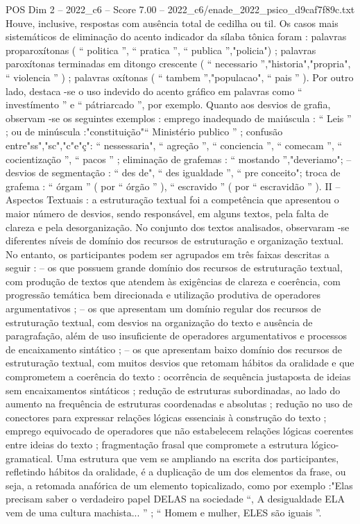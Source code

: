 \begin{textsample}{POS Dim 2 – 2022\_c6 – Score 7.00 – 2022\_c6/enade\_2022\_psico\_d9caf7f89c.txt}
Houve, inclusive, respostas com ausência total de cedilha ou til.
Os casos mais sistemáticos de eliminação do acento indicador da sílaba tônica foram : palavras proparoxítonas ( “ politica ”, “ pratica ”, “ publica ”,"policia") ; palavras paroxítonas terminadas em ditongo crescente ( “ necessario ”,"historia","propria", “ violencia ” ) ; palavras oxítonas ( “ tambem ”,"populacao", “ pais ” ).
Por outro lado, destaca -se o uso indevido do acento gráfico em palavras como “ investímento ” e “ pátriarcado ”, por exemplo.
Quanto aos desvios de grafia, observam -se os seguintes exemplos : emprego inadequado de maiúscula : “ Leis ” ; ou de minúscula :"constituição"“ Ministério publico ” ; confusão entre"ss","sc","c"e"ç": “ nessessaria", “ agreção ”, “ conciencia ”, “ comecam ”, “ cocientização ”, “ pacos ” ; eliminação de grafemas : “ mostando ”,"deveriamo"; – desvios de segmentação : “ des de", “ des igualdade ”, “ pre conceito"; troca de grafema : “ órgam ” ( por “ órgão ” ), “ escravido ” ( por “ escravidão ” ).
II – Aspectos Textuais : a estruturação textual foi a competência que apresentou o maior número de desvios, sendo responsável, em alguns textos, pela falta de clareza e pela desorganização.
No conjunto dos textos analisados, observaram -se diferentes níveis de domínio dos recursos de estruturação e organização textual.
No entanto, os participantes podem ser agrupados em três faixas descritas a seguir : – os que possuem grande domínio dos recursos de estruturação textual, com produção de textos que atendem às exigências de clareza e coerência, com progressão temática bem direcionada e utilização produtiva de operadores argumentativos ; – os que apresentam um domínio regular dos recursos de estruturação textual, com desvios na organização do texto e ausência de paragrafação, além de uso insuficiente de operadores argumentativos e processos de encaixamento sintático ; – os que apresentam baixo domínio dos recursos de estruturação textual, com muitos desvios que retomam hábitos da oralidade e que comprometem a coerência do texto : ocorrência de sequência justaposta de ideias sem encaixamentos sintáticos ; redução de estruturas subordinadas, ao lado do aumento na frequência de estruturas coordenadas e absolutas ; redução no uso de conectores para expressar relações lógicas essenciais à construção do texto ; emprego equivocado de operadores que não estabelecem relações lógicas coerentes entre ideias do texto ; fragmentação frasal que compromete a estrutura lógico-gramatical.
Uma estrutura que vem se ampliando na escrita dos participantes, refletindo hábitos da oralidade, é a duplicação de um dos elementos da frase, ou seja, a retomada anafórica de um elemento topicalizado, como por exemplo :"Elas precisam saber o verdadeiro papel DELAS na sociedade “, A desigualdade ELA vem de uma cultura machista... ” ; “ Homem e mulher, ELES são iguais ”.

\end{textsample}
